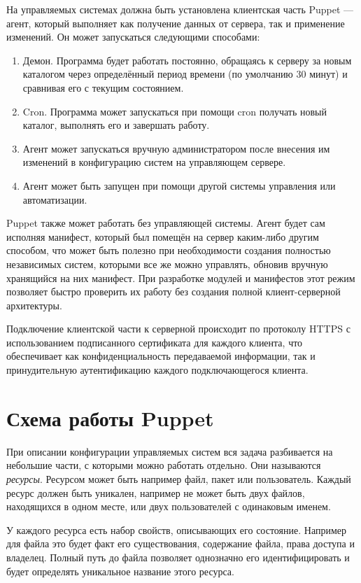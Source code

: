 На управляемых системах должна быть установлена клиентская часть Puppet — агент, который выполняет как получение данных от сервера, так и применение изменений. Он может запускаться следующими способами:

\begin{enumerate}
\item Демон. Программа будет работать постоянно, обращаясь к серверу за новым каталогом через определённый период времени (по умолчанию 30 минут) и сравнивая его с текущим состоянием.
\item Cron. Программа может запускаться при помощи cron получать новый каталог, выполнять его и завершать работу.
\item Агент может запускаться вручную администратором после внесения им изменений в конфигурацию систем на управляющем сервере.
\item Агент может быть запущен при помощи другой системы управления или автоматизации.
\end{enumerate}

Puppet также может работать без управляющей системы. Агент будет сам исполняя манифест, который был помещён на сервер каким-либо другим способом, что может быть полезно при необходимости создания полностью независимых систем, которыми все же можно управлять, обновив вручную хранящийся на них манифест. При разработке модулей и манифестов этот режим позволяет быстро проверить их работу без создания полной клиент-серверной архитектуры.

Подключение клиентской части к серверной происходит по протоколу HTTPS с использованием подписанного сертификата для каждого клиента, что обеспечивает как конфиденциальность передаваемой информации, так и принудительную аутентификацию каждого подключающегося клиента.

\section{Схема работы Puppet}

При описании конфигурации управляемых систем вся задача разбивается на небольшие части, с которыми можно работать отдельно. Они называются \emph{ресурсы}. Ресурсом может быть например файл, пакет или пользователь. Каждый ресурс должен быть уникален, например не может быть двух файлов, находящихся в одном месте, или двух пользователей с одинаковым именем.

У каждого ресурса есть набор свойств, описывающих его состояние. Например для файла это будет факт его существования, содержание файла, права доступа и владелец. Полный путь до файла позволяет однозначно его идентифицировать и будет определять уникальное название этого ресурса.


